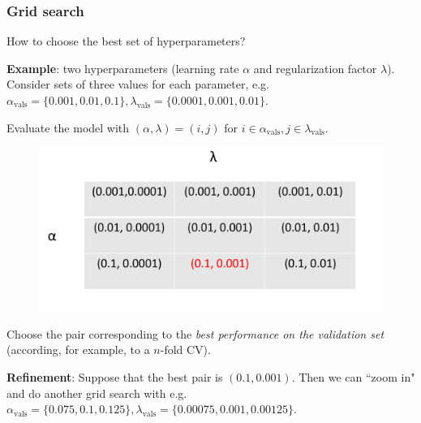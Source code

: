\documentclass{beamer}
\begin{document}
	\begin{frame}
		\frametitle{Grid search}
		
		How to choose the best set of hyperparameters?
		
		\vspace{2mm}
		
		\textbf{Example}: two hyperparameters (learning rate $\alpha$ and regularization factor $\lambda$). Consider sets of three values for each parameter, e.g. $\alpha_{\text{vals}} = \{0.001, 0.01, 0.1\}, \lambda_{\text{vals}} = \{0.0001, 0.001, 0.01\}$. 
		
		Evaluate the model with $(\alpha, \lambda) = (i,j)$ for $i \in \alpha_{\text{vals}}, j \in \lambda_{\text{vals}}$.
		
		\begin{figure}
			\centering
			\includegraphics[scale=0.4]{images/grid-search}
		\end{figure}
		Choose the pair corresponding to the \textit{best performance on the validation set} (according, for example, to a $n$-fold CV). 
		
		\vspace{2mm}
		
		\textbf{Refinement}: Suppose that the best pair is $(0.1, 0.001)$. Then we can ``zoom in" and do another grid search with e.g. $\alpha_{\text{vals}} = \{0.075, 0.1, 0.125\}, \lambda_{\text{vals}} = \{0.00075, 0.001, 0.00125\}$. 
		
	\end{frame}
	

	
\end{document}
